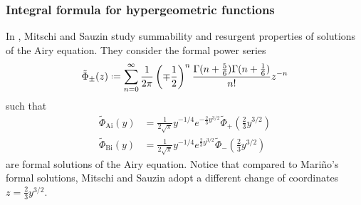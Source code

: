 \documentclass{article}
\newcommand{\series}[1]{\tilde{#1}}
\newcommand*{\defeq}{\mathrel{\vcenter{\baselineskip0.5ex \lineskiplimit0pt
                     \hbox{\scriptsize.}\hbox{\scriptsize.}}}%
                     =}
\newcommand{\borel}{\mathcal{B}}
\theoremstyle{definition}
\theoremstyle{plain}
\begin{document}
%
%
%
\subsubsection{Integral formula for hypergeometric functions}
%
In \cite{diverg-resurg-i}, Mitschi and Sauzin study summability and resurgent properties of solutions of the Airy equation. They consider the formal power series
\[\series{\Phi}_{\pm}(z)\defeq \sum_{n=0}^{\infty}\frac{1}{2\pi}\left(\mp\frac{1}{2}\right)^{n}\frac{\Gamma(n+\frac{5}{6})\Gamma(n+\frac{1}{6})}{n!}z^{-n}\]
such that
\begin{align*}
\series{\Phi}_{\mathrm{Ai}}(y)&=\frac{1}{2\sqrt{\pi}}y^{-1/4}e^{-\tfrac{2}{3}y^{3/2}}\series{\Phi}_{+}\left(\tfrac{2}{3}y^{3/2}\right)\\
\series{\Phi}_{\mathrm{Bi}}(y)&=\frac{1}{2\sqrt{\pi}}y^{-1/4}e^{\tfrac{2}{3}y^{3/2}}\series{\Phi}_{-}\left(\tfrac{2}{3}y^{3/2}\right)
\end{align*} 
are formal solutions of the Airy equation. Notice that compared to Mari\~{n}o's formal solutions, Mitschi and Sauzin adopt a different change of coordinates $z=\frac{2}{3}y^{3/2}$.  
\end{document}
